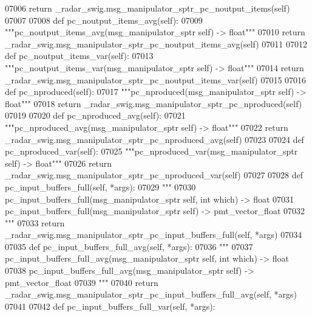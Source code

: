 \begin{DoxyCode}
{{{{{{{{{{{{{{{{{{{{{{{07006         \textcolor{keywordflow}{return} \_radar\_swig.msg\_manipulator\_sptr\_pc\_noutput\_items(self)
07007 
07008     \textcolor{keyword}{def }pc_noutput_items_avg(self):
07009         \textcolor{stringliteral}{"""pc\_noutput\_items\_avg(msg\_manipulator\_sptr self) -> float"""}
07010         \textcolor{keywordflow}{return} \_radar\_swig.msg\_manipulator\_sptr\_pc\_noutput\_items\_avg(self)
07011 
07012     \textcolor{keyword}{def }pc_noutput_items_var(self):
07013         \textcolor{stringliteral}{"""pc\_noutput\_items\_var(msg\_manipulator\_sptr self) -> float"""}
07014         \textcolor{keywordflow}{return} \_radar\_swig.msg\_manipulator\_sptr\_pc\_noutput\_items\_var(self)
07015 
07016     \textcolor{keyword}{def }pc_nproduced(self):
07017         \textcolor{stringliteral}{"""pc\_nproduced(msg\_manipulator\_sptr self) -> float"""}
07018         \textcolor{keywordflow}{return} \_radar\_swig.msg\_manipulator\_sptr\_pc\_nproduced(self)
07019 
07020     \textcolor{keyword}{def }pc_nproduced_avg(self):
07021         \textcolor{stringliteral}{"""pc\_nproduced\_avg(msg\_manipulator\_sptr self) -> float"""}
07022         \textcolor{keywordflow}{return} \_radar\_swig.msg\_manipulator\_sptr\_pc\_nproduced\_avg(self)
07023 
07024     \textcolor{keyword}{def }pc_nproduced_var(self):
07025         \textcolor{stringliteral}{"""pc\_nproduced\_var(msg\_manipulator\_sptr self) -> float"""}
07026         \textcolor{keywordflow}{return} \_radar\_swig.msg\_manipulator\_sptr\_pc\_nproduced\_var(self)
07027 
07028     \textcolor{keyword}{def }pc_input_buffers_full(self, *args):
07029         \textcolor{stringliteral}{"""}
07030 \textcolor{stringliteral}{        pc\_input\_buffers\_full(msg\_manipulator\_sptr self, int which) -> float}
07031 \textcolor{stringliteral}{        pc\_input\_buffers\_full(msg\_manipulator\_sptr self) -> pmt\_vector\_float}
07032 \textcolor{stringliteral}{        """}
07033         \textcolor{keywordflow}{return} \_radar\_swig.msg\_manipulator\_sptr\_pc\_input\_buffers\_full(self, *args)
07034 
07035     \textcolor{keyword}{def }pc_input_buffers_full_avg(self, *args):
07036         \textcolor{stringliteral}{"""}
07037 \textcolor{stringliteral}{        pc\_input\_buffers\_full\_avg(msg\_manipulator\_sptr self, int which) -> float}
07038 \textcolor{stringliteral}{        pc\_input\_buffers\_full\_avg(msg\_manipulator\_sptr self) -> pmt\_vector\_float}
07039 \textcolor{stringliteral}{        """}
07040         \textcolor{keywordflow}{return} \_radar\_swig.msg\_manipulator\_sptr\_pc\_input\_buffers\_full\_avg(self, *args)
07041 
07042     \textcolor{keyword}{def }pc_input_buffers_full_var(self, *args):
}}}}}}}}}}}}}}}}}}}}}}}
\end{DoxyCode}
